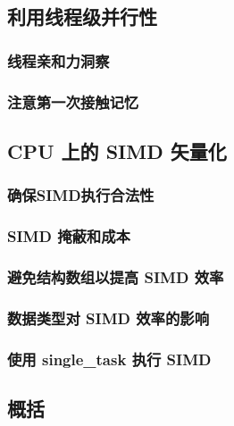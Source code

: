 \subsection{利用线程级并行性}

\subsubsection{线程亲和力洞察}

\subsubsection{注意第一次接触记忆}

\subsection{CPU 上的 SIMD 矢量化}

\subsubsection{确保SIMD执行合法性}

\subsubsection{SIMD 掩蔽和成本}

\subsubsection{避免结构数组以提高 SIMD 效率}

\subsubsection{数据类型对 SIMD 效率的影响}

\subsubsection{使用 single\_task 执行 SIMD}

\subsection{概括}